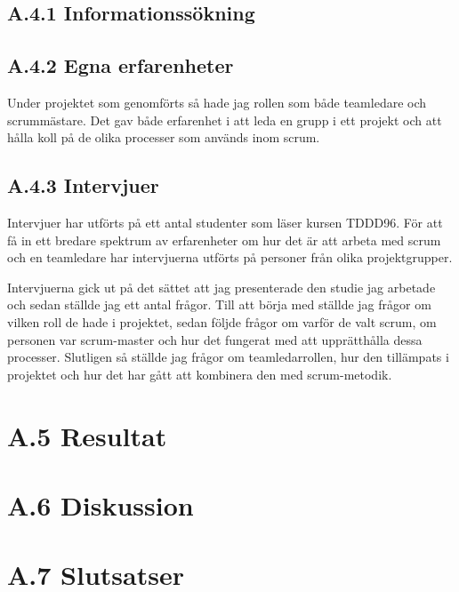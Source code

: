 \subsection{A.4.1 Informationssökning}


\subsection{A.4.2 Egna erfarenheter}
Under projektet som genomförts så hade jag rollen som både teamledare och scrummästare. Det gav både erfarenhet i att leda en grupp i ett projekt och att hålla koll på de olika processer som används inom scrum.
 
\subsection{A.4.3 Intervjuer}
Intervjuer har utförts på ett antal studenter som läser kursen TDDD96. För att få in ett bredare spektrum av erfarenheter om hur det är att arbeta med scrum och en teamledare har intervjuerna utförts på personer från olika projektgrupper.

Intervjuerna gick ut på det sättet att jag presenterade den studie jag arbetade och sedan ställde jag ett antal frågor. Till att börja med ställde jag frågor om vilken roll de hade i projektet, sedan följde frågor om varför de valt scrum, om personen var scrum-master och hur det fungerat med att upprätthålla dessa processer. Slutligen så ställde jag frågor om teamledarrollen, hur den tillämpats i projektet och hur det har gått att kombinera den med scrum-metodik.

\section{A.5 Resultat}

\section{A.6 Diskussion}

\section{A.7 Slutsatser}

